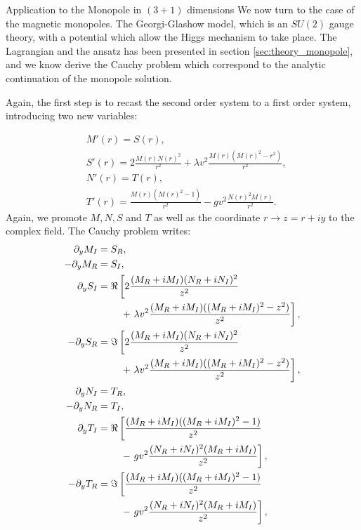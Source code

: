 \begin{section}{Application to the Monopole in $(3+1)$ dimensions}
  We now turn to the case of the magnetic monopoles. The
  Georgi-Glashow model, which is an $SU(2)$ gauge theory, with a
  potential which allow the Higgs mechanism to take place.  The
  Lagrangian and the ansatz has been presented in section
  \ref{sec:theory_monopole}, and we know derive the Cauchy problem
  which correspond to the analytic continuation of the monopole
  solution.

  Again, the first step is to recast the second order system to a
  first order system, introducing two new variables:

  \begin{align}
    &M'(r) = S(r),\\
    &S'(r) = 2\frac{M(r)N(r)^2}{r^2}+\lambda v^2\frac{M(r)(M(r)^2-r^2)}{r^2},\\
    &N'(r) = T(r),\\
    &T'(r) = \frac{M(r)(M(r)^2-1)}{r^2}-gv^2\frac{N(r)^2M(r)}{r^2}.
  \end{align}
  Again, we promote $M,N,S$ and $T$ as well as the coordinate $r\to
  z=r+iy$ to the complex field. The Cauchy problem writes:
  \begin{align}
    \partial_y M_I &= S_R,\\
    -\partial_y M_R &= S_I,\\
    \partial_y S_I &= \Re\left[2\frac{(M_R+iM_I)(N_R+iN_I)^2}{z^2}\right.\\
      &\hphantom{= \Re\left[\right.}+\left.\lambda v^2 \frac{(M_R+iM_I)((M_R+iM_I)^2-z^2)}{z^2}\right],\\
      -\partial_y S_R &= \Im\left[2\frac{(M_R+iM_I)(N_R+iN_I)^2}{z^2}\right.\\
        &\hphantom{= \Re\left[\right.}+\left.\lambda v^2 \frac{(M_R+iM_I)((M_R+iM_I)^2-z^2)}{z^2}\right],\\
        \partial_y N_I &= T_R,\\
        -\partial_y N_R &= T_I,\\
        \partial_y T_I &= \Re\left[\frac{(M_R+iM_I)((M_R+iM_I)^2-1)}{z^2}\right.\\
          &\hphantom{=\Re\left[\right.}-\left.gv^2\frac{(N_R+iN_I)^2(M_R+iM_I)}{z^2}\right],\\
          -\partial_y T_R &= \Im\left[\frac{(M_R+iM_I)((M_R+iM_I)^2-1)}{z^2}\right.\\
      &\hphantom{=\Re\left[\right.}-\left.gv^2\frac{(N_R+iN_I)^2(M_R+iM_I)}{z^2}\right],
  \end{align}

\end{section}
